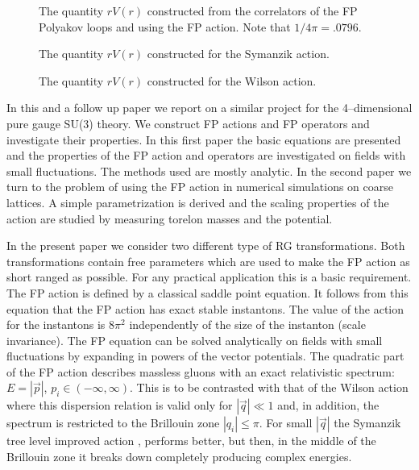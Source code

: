 \begin{figure}[htb]
\begin{center}
\leavevmode
\epsfxsize=90mm
\end{center}
\caption{ The quantity $rV(r)$ constructed from the correlators of the
FP Polyakov loops and using the FP action.
Note that $1/4\pi=.0796$. }
\label{fig:rvrperfect}
\end{figure}
 

\begin{figure}[htb]
\begin{center}
\leavevmode
\epsfxsize=90mm
\end{center}
\caption{ The quantity $rV(r)$ constructed
for the Symanzik action.
}
\label{fig:rvrsyman}
\end{figure}
 

\begin{figure}[htb]
\begin{center}
\leavevmode
\epsfxsize=90mm
\end{center}
\caption{ The quantity $rV(r)$ constructed
for the Wilson action.
}
\label{fig:rvrwilson}
\end{figure}


In this and a follow up paper \cite{II} we report on a similar project
for the 4--dimensional pure gauge SU(3) theory. We construct
FP actions and FP operators and investigate their properties.
In this first paper the basic equations are presented
and the properties of the FP action and operators are investigated
on fields with small fluctuations. The methods used are mostly analytic.
In the second paper we turn to the problem of using the FP action
in numerical simulations on coarse lattices. A simple parametrization
is derived and the scaling properties of the action are studied
by measuring torelon masses and the potential.

In the present paper we consider two different type of RG
transformations. Both transformations contain free parameters
which are used to make the FP action as short ranged as possible.
For any practical application this is a basic requirement. 
The FP action is defined by a classical saddle point equation.
It follows from this equation that the FP action has exact stable
instantons. The value of the action for the instantons
is $8\pi^2$ independently of the size of the instanton
(scale invariance). The FP equation can be solved analytically
on fields with small fluctuations by expanding in powers of 
the vector potentials.
The quadratic part of the FP action describes massless gluons
with an exact relativistic spectrum: $E=| \vec{p} |$,
$p_i \in (-\infty,\infty)$.
This is to be contrasted with that of the Wilson action where
this dispersion relation is valid only for $|\vec{q}| \ll 1$ and,
in addition, the spectrum is restricted to
the Brillouin zone $|q_i| \le \pi$.
For small $| \vec{q}|$ the Symanzik tree level improved action
\cite{SYMANZIK}, \cite{WEISZ}
performs better, but then, in the middle of the Brillouin zone
it breaks down completely producing complex energies.

